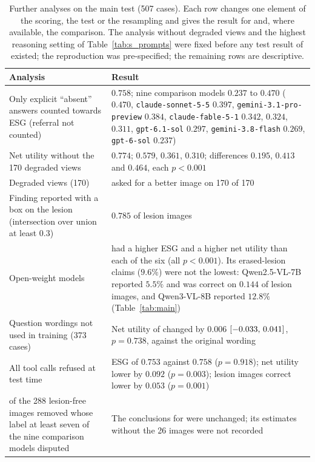 \begin{table}[!htbp]
\caption{Further analyses on the main test (507 cases). Each row changes one element of the scoring, the test or the resampling and gives the result for \ms{} and, where available, the comparison. The analysis without degraded views and the highest reasoning setting of Table~\ref{tab:s_prompts} were fixed before any test result of \ms{} existed; the reproduction was pre-specified; the remaining rows are descriptive.}
\label{tab:s_sensitivity}
\centering
\small
\begin{adjustbox}{max width=\linewidth}
\begin{tabular}{L{6.4cm}L{9.6cm}}
\toprule
Analysis & Result \\
\midrule
Only explicit ``absent'' answers counted towards ESG (referral not counted) & \ms{} $0.758$; nine comparison models $0.237$ to $0.470$ (\gem{} $0.470$, \texttt{claude-sonnet-5-5} $0.397$, \texttt{gemini-3.1-pro-preview} $0.384$, \texttt{claude-fable-5-1} $0.342$, \opus{} $0.324$, \gpt{} $0.311$, \texttt{gpt-6.1-sol} $0.297$, \texttt{gemini-3.8-flash} $0.269$, \texttt{gpt-6-sol} $0.237$) \\
\addlinespace
Net utility without the 170 degraded views & \ms{} $0.774$; \gem{} $0.579$, \opus{} $0.361$, \gpt{} $0.310$; differences $0.195$, $0.413$ and $0.464$, each $p < 0.001$ \\
\addlinespace
Degraded views (170) & \ms{} asked for a better image on 170 of 170 \\
\addlinespace
Finding reported with a box on the lesion (intersection over union at least $0.3$) & \ms{} $0.785$ of lesion images \\
\addlinespace
Open-weight models & \ms{} had a higher ESG and a higher net utility than each of the six (all $p < 0.001$). Its erased-lesion claims ($9.6\%$) were not the lowest: Qwen2.5-VL-7B reported $5.5\%$ and was correct on $0.144$ of lesion images, and Qwen3-VL-8B reported $12.8\%$ (Table~\ref{tab:main}) \\
\addlinespace
Question wordings not used in training (373 cases) & Net utility of \ms{} changed by $0.006$ $[-0.033,\,0.041]$, $p = 0.738$, against the original wording \\
\addlinespace
All tool calls refused at test time & ESG of \ms{} $0.753$ against $0.758$ ($p = 0.918$); net utility lower by $0.092$ ($p = 0.003$); lesion images correct lower by $0.053$ ($p = 0.001$) \\
 of the 288 lesion-free images removed whose label at least seven of the nine comparison models disputed & The conclusions for \ms{} were unchanged; its estimates without the 26 images were not recorded \\

\end{tabular}
\end{adjustbox}
\end{table}
